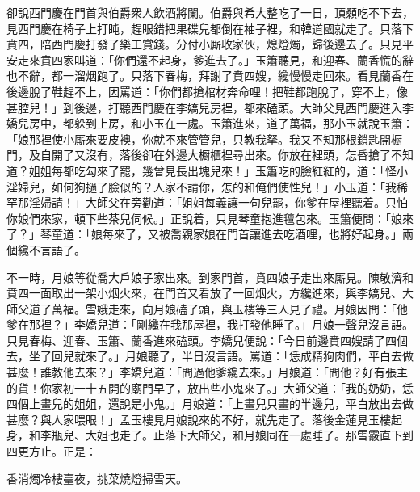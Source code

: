 卻說西門慶在門首與伯爵衆人飲酒將闌。伯爵與希大整吃了一日，頂顙吃不下去，見西門慶在椅子上打盹，趕眼錯把果碟兒都倒在袖子裡，{}和韓道國就走了。只落下賁四，陪西門慶打發了樂工賞錢。分付小厮收家伙，熄燈燭，歸後邊去了。只見平安走來賁四家叫道：「你們還不起身，爹進去了。」玉簫聽見，和迎春、蘭香慌的辭也不辭，都一溜烟跑了。只落下春梅，拜謝了賁四嫂，纔慢慢走回來。{}看見蘭香在後邊脫了鞋趕不上，因罵道：「你們都搶棺材奔命哩！把鞋都跑脫了，穿不上，像甚腔兒！」到後邊，打聽西門慶在李嬌兒房裡，都來磕頭。大師父見西門慶進入李嬌兒房中，都躲到上房，和小玉在一處。玉簫進來，道了萬福，那小玉就說玉簫：「娘那裡使小厮來要皮襖，你就不來管管兒，只教我拏。我又不知那根鎻匙開橱門，及自開了又沒有，落後卻在外邊大橱櫃裡尋出來。你放在裡頭，怎昏搶了不知道？姐姐每都吃勾來了罷，幾曾見長出塊兒來！」玉簫吃的臉紅紅的，道：「怪小淫婦兒，如何狗撾了臉似的？人家不請你，怎的和俺們使性兒！」小玉道：「我稀罕那淫婦請！」{}大師父在旁勸道：「姐姐每義讓一句兒罷，你爹在屋裡聽着。只怕你娘們來家，頓下些茶兒伺候。」正說着，只見琴童抱進氊包來。玉簫便問：「娘來了？」琴童道：「娘每來了，又被喬親家娘在門首讓進去吃酒哩，也將好起身。」兩個纔不言語了。

不一時，月娘等從喬大戶娘子家出來。到家門首，賁四娘子走出來厮見。陳敬濟和賁四一面取出一架小烟火來，在門首又看放了一回烟火，方纔進來，與李嬌兒、大師父道了萬福。雪娥走來，向月娘磕了頭，與玉樓等三人見了禮。月娘因問：「他爹在那裡？」李嬌兒道：「剛纔在我那屋裡，我打發他睡了。」月娘一聲兒沒言語。只見春梅、迎春、玉簫、蘭香進來磕頭。李嬌兒便說：「今日前邊賁四嫂請了四個去，坐了回兒就來了。」月娘聽了，半日沒言語。罵道：「恁成精狗肉們，平白去做甚麼！誰教他去來？」李嬌兒道：「問過他爹纔去來。」月娘道：「問他？好有張主的貨！你家初一十五開的廟門早了，放出些小鬼來了。」大師父道：「我的奶奶，恁四個上畫兒的姐姐，還說是小鬼。」月娘道：「上畫兒只畫的半邊兒，平白放出去做甚麼？與人家喂眼！」孟玉樓見月娘說來的不好，就先走了。落後金蓮見玉樓起身，和李瓶兒、大姐也走了。止落下大師父，和月娘同在一處睡了。那雪霰直下到四更方止。正是：

\begin{myquote}
香消燭冷樓臺夜，挑菜燒燈掃雪天。
\end{myquote}

